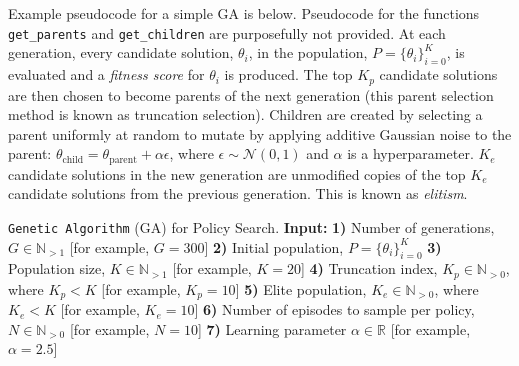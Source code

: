 \documentclass[]{article}
\begin{document}
Example pseudocode for a simple GA is below. Pseudocode for the functions \texttt{get\_parents} and \texttt{get\_children} are purposefully not provided. At each generation, every candidate solution, $\theta_i$, in the population, $P=\{\theta_i\}_{i=0}^K$, is evaluated and a \emph{fitness score} for $\theta_i$ is produced. The top $K_p$ candidate solutions are then chosen to become parents of the next generation (this parent selection method is known as truncation selection). Children are created by selecting a parent uniformly at random to mutate by applying additive Gaussian noise to the parent: $\theta_{\text{child}} = \theta_{\text{parent}} + \alpha\epsilon$, where $\epsilon \sim \mathcal N(0,1)$ and $\alpha$ is a hyperparameter. $K_e$ candidate solutions in the new generation are unmodified copies of the top $K_e$ candidate solutions from the previous generation. This is known as \emph{elitism}. 
\\
\begin{algorithm}[H]
\caption{\texttt{Genetic Algorithm} (GA) for Policy Search.\newline
\textbf{Input:}
\newline \textbf{1)} Number of generations, $G \in \mathbb N_{>1}$ [for example, $G=300$]
\newline \textbf{2)} Initial population, $P = \{\theta_i\}_{i=0}^K$
\newline \textbf{3)} Population size, $K \in \mathbb N_{>1}$ [for example, $K=20$]
\newline \textbf{4)} Truncation index, $K_p \in \mathbb N_{>0}$, where $K_p < K$ [for example, $K_p=10$]
\newline \textbf{5)} Elite population, $K_e \in \mathbb N_{>0}$, where $K_e < K$ [for example, $K_e=10$]
\newline \textbf{6)} Number of episodes to sample per policy, $N \in \mathbb N_{>0}$ [for example, $N=10$]
\newline \textbf{7)} Learning parameter $\alpha \in \mathbb R$ [for example, $\alpha=2.5$]}
\label{alg:crossEntropy}
\end{algorithm}
\end{document}
